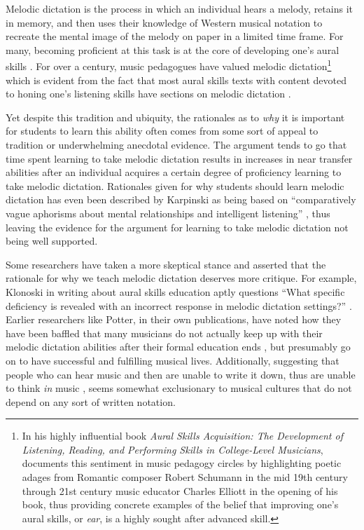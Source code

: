 \documentclass[]{book}
\let\rmarkdownfootnote\footnote%
\def\footnote{\protect\rmarkdownfootnote}
\begin{document}
Melodic dictation is the process in which an individual hears a melody, retains it in memory, and then uses their knowledge of Western musical notation to recreate the mental image of the melody on paper in a limited time frame.
For many, becoming proficient at this task is at the core of developing one's aural skills \citep{karpinskiModelMusicPerception1990}.
For over a century, music pedagogues have valued melodic dictation\footnote{In his highly influential book \emph{Aural Skills Acquisition: The Development of Listening, Reading, and Performing Skills in College-Level Musicians}, \citet{karpinskiAuralSkillsAcquisition2000} documents this sentiment in music pedagogy circles by highlighting poetic adages from Romantic composer Robert Schumann in the mid 19th century through 21st century music educator Charles Elliott in the opening of his book, thus providing concrete examples of the belief that improving one's aural skills, or \emph{ear}, is a highly sought after advanced skill.} which is evident from the fact that most aural skills texts with content devoted to honing one's listening skills have sections on melodic dictation \citep{karpinskiAuralSkillsAcquisition2000}.

Yet despite this tradition and ubiquity, the rationales as to \emph{why} it is important for students to learn this ability often comes from some sort of appeal to tradition or underwhelming anecdotal evidence.
The argument tends to go that time spent learning to take melodic dictation results in increases in near transfer abilities after an individual acquires a certain degree of proficiency learning to take melodic dictation.
Rationales given for why students should learn melodic dictation has even been described by Karpinski as being based on ``comparatively vague aphorisms about mental relationships and intelligent listening'' \citep[p.~192]{karpinskiModelMusicPerception1990}, thus leaving the evidence for the argument for learning to take melodic dictation not being well supported.

Some researchers have taken a more skeptical stance and asserted that the rationale for why we teach melodic dictation deserves more critique.
For example, Klonoski in writing about aural skills education aptly questions ``What specific deficiency is revealed with an incorrect response in melodic dictation settings?'' \citep{klonoskiImprovingDictationAuralSkills2006}.
Earlier researchers like Potter, in their own publications, have noted how they have been baffled that many musicians do not actually keep up with their melodic dictation abilities after their formal education ends \citep{potterIdentifyingSucessfulDictation1990}, but presumably go on to have successful and fulfilling musical lives.
Additionally, suggesting that people who can hear music and then are unable to write it down, thus are unable to think \emph{in} music \citep{karpinskiAuralSkillsAcquisition2000}, seems somewhat exclusionary to musical cultures that do not depend on any sort of written notation.
\end{document}

